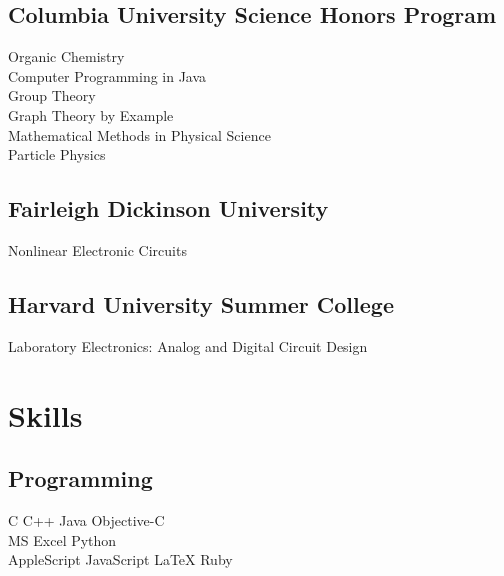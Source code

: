 \documentclass[letterpaper]{deedy-resume} %
\begin{document}
\begin{minipage}[t]{0.39\textwidth}
\subsection{Columbia University Science Honors Program}
Organic Chemistry \\
Computer Programming in Java \\
Group Theory \\
Graph Theory by Example \\
Mathematical Methods in Physical Science \\
Particle Physics \\

\sectionspace %


\subsection{Fairleigh Dickinson University}
Nonlinear Electronic Circuits \\

\sectionspace %


\subsection{Harvard University Summer College}
Laboratory Electronics: Analog and Digital Circuit Design \\

\sectionspace %


\section{Skills}

\subsection{Programming}

C \textbullet{} C++ \textbullet{} Java \textbullet{} Objective-C \\
MS Excel \textbullet{} Python \\ 
AppleScript \textbullet{} JavaScript \textbullet{} \LaTeX \textbullet{} Ruby \\


\end{minipage}
\end{document}
